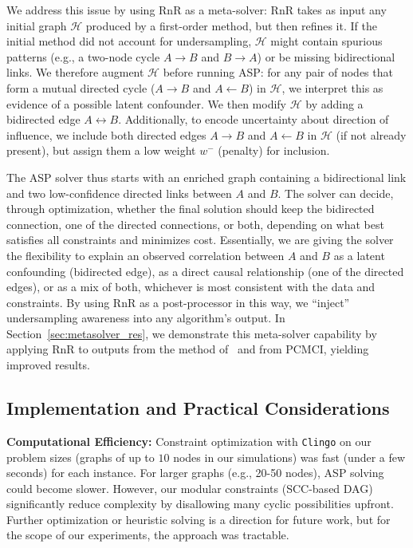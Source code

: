We address this issue by using RnR as a meta-solver: RnR takes as input any initial graph $\mathcal{H}$ produced by a first-order method, but then refines it. If the initial method did not account for undersampling, $\mathcal{H}$ might contain spurious patterns (e.g., a two-node cycle $A \rightarrow B$ and $B \rightarrow A$) or be missing bidirectional links. We therefore augment $\mathcal{H}$ before running ASP: for any pair of nodes that form a mutual directed cycle ($A \rightarrow B$ and $A \leftarrow B$) in $\mathcal{H}$, we interpret this as evidence of a possible latent confounder. We then modify $\mathcal{H}$ by adding a bidirected edge $A \leftrightarrow B$. Additionally, to encode uncertainty about direction of influence, we include both directed edges $A \rightarrow B$ and $A \leftarrow B$ in $\mathcal{H}$ (if not already present), but assign them a low weight $w^-$ (penalty) for inclusion. 

The ASP solver thus starts with an enriched graph containing a bidirectional link and two low-confidence directed links between $A$ and $B$. The solver can decide, through optimization, whether the final solution should keep the bidirected connection, one of the directed connections, or both, depending on what best satisfies all constraints and minimizes cost. Essentially, we are giving the solver the flexibility to explain an observed correlation between $A$ and $B$ as a latent confounding (bidirected edge), as a direct causal relationship (one of the directed edges), or as a mix of both, whichever is most consistent with the data and constraints. By using RnR as a post-processor in this way, we “inject” undersampling awareness into any algorithm’s output. In Section~\ref{sec:metasolver_res}, we demonstrate this meta-solver capability by applying RnR to outputs from the method of~\cite{sanchez2019estimating} and from PCMCI, yielding improved results.
\vspace{-10pt}
\subsection{Implementation and Practical Considerations}


\textbf{Computational Efficiency:} Constraint optimization with \texttt{Clingo} on our problem sizes (graphs of up to $10$ nodes in our simulations) was fast (under a few seconds) for each instance. For larger graphs (e.g., 20-50 nodes), ASP solving could become slower. However, our modular constraints (SCC-based DAG) significantly reduce complexity by disallowing many cyclic possibilities upfront. Further optimization or heuristic solving is a direction for future work, but for the scope of our experiments, the approach was tractable.

